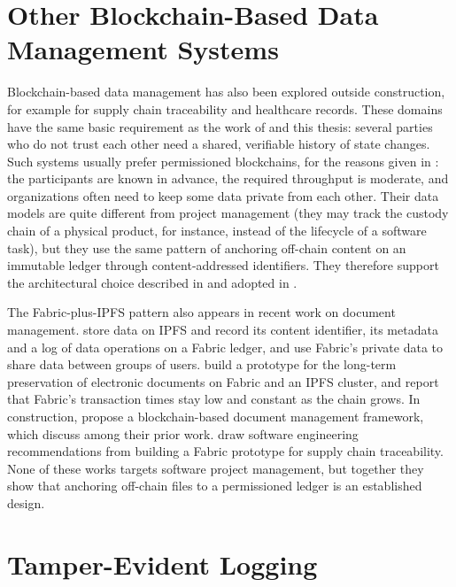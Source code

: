 \section{Other Blockchain-Based Data Management Systems}
\label{sec:other-blockchain}

Blockchain-based data management has also been explored outside construction, for example for supply chain traceability and healthcare records. These domains have the same basic requirement as the work of \textcite{adel2023} and this thesis: several parties who do not trust each other need a shared, verifiable history of state changes. Such systems usually prefer permissioned blockchains, for the reasons given in : the participants are known in advance, the required throughput is moderate, and organizations often need to keep some data private from each other. Their data models are quite different from project management (they may track the custody chain of a physical product, for instance, instead of the lifecycle of a software task), but they use the same pattern of anchoring off-chain content on an immutable ledger through content-addressed identifiers. They therefore support the architectural choice described in  and adopted in .

The Fabric-plus-IPFS pattern also appears in recent work on document management. \textcite{wen2024sharing} store data on IPFS and record its content identifier, its metadata and a log of data operations on a Fabric ledger, and use Fabric's private data to share data between groups of users. \textcite{calderon2026gestion} build a prototype for the long-term preservation of electronic documents on Fabric and an IPFS cluster, and report that Fabric's transaction times stay low and constant as the chain grows. In construction, \textcite{das2022document} propose a blockchain-based document management framework, which \textcite{adel2023} discuss among their prior work. \textcite{hushare2025practices} draw software engineering recommendations from building a Fabric prototype for supply chain traceability. None of these works targets software project management, but together they show that anchoring off-chain files to a permissioned ledger is an established design.

\section{Tamper-Evident Logging}
\label{sec:related-logging}

